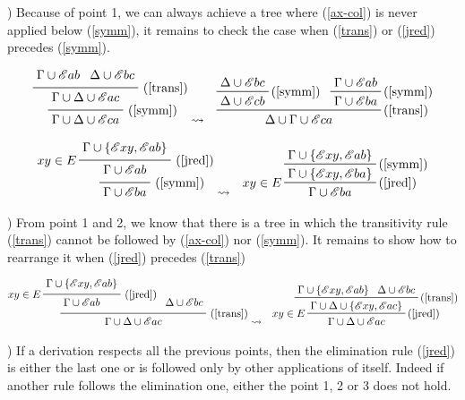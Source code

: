 \documentclass[a4paper,12pt,oneside]{book}
\newcommand{\E}{\mathscr{E}}
\begin{document}
) Because of point 1, we can always achieve a tree where (\ref{ax-col}) is never applied below (\ref{symm}), it remains to check the case when  (\ref{trans}) or (\ref{jred}) precedes (\ref{symm}).

\begin{eqnarray*}
\prfrulenameskip=0.4em\prflinepadbefore=1ex
\prftree[r]{(\ref{symm})} {\prftree[r]{(\ref{trans})}{\Gamma\cup \E ab  }{\Delta\cup \E bc}
{\Gamma\cup\Delta\cup \E ac } 
 }{\Gamma\cup\Delta\cup\E ca } 
& \leadsto
&\prftree[r]{(\ref{trans})} 
 { \prftree[r]{(\ref{symm})}{\Delta\cup\E bc } { \Delta\cup\E cb  } }
 {\prftree[r]{(\ref{symm})}{\Gamma\cup\E ab} { \Gamma\cup\E ba  } }
{\Delta\cup\Gamma\cup\E ca}
 \end{eqnarray*}


\begin{eqnarray*}
\prfrulenameskip=0.4em\prflinepadbefore=1ex
\prftree[r]{(\ref{symm})} 
{\prftree[l,r]{(\ref{jred})}{$xy \in E$}{\Gamma \cup \{\E xy ,\E ab \}}{\Gamma \cup \E ab }}
{\Gamma  \cup \E ba }
& \leadsto
&\prftree[l,r]{(\ref{jred})}{$xy \in E$} 
{\prftree[r]{(\ref{symm})}
{\Gamma \cup \{\E xy ,\E ab \}}
{\Gamma\cup \{\E xy , \E ba \} }}
{\Gamma \cup \E ba }
 \end{eqnarray*}



) From point 1 and 2, we know that there is a tree in which the transitivity rule (\ref{trans}) cannot be followed by (\ref{ax-col}) nor (\ref{symm}). It remains to show how to rearrange it when (\ref{jred}) precedes (\ref{trans})

\begin{eqnarray*}
\prfrulenameskip=0.4em\prflinepadbefore=1ex
\prftree[r]{(\ref{trans})} 
{\prftree[l,r]{(\ref{jred})}{$xy \in E$}{\Gamma \cup \{\E xy ,\E ab \}}{\Gamma \cup \E ab }}
{ \prfassumption{\Delta \cup \E bc  }}
{\Gamma \cup \Delta \cup \E ac }
& \leadsto
&\prftree[l,r]{(\ref{jred})}{$xy \in E$} 
{\prftree[r]{(\ref{trans})}
{\Gamma \cup \{\E xy ,\E ab \}}{\Delta \cup \E bc }
{\Gamma\cup\Delta \cup \{\E xy , \E ac \} }}
{\Gamma \cup \Delta \cup \E ac }
 \end{eqnarray*}

) If a derivation respects all the previous points, then the elimination rule (\ref{jred}) is either the last one or is followed only by other applications of itself. Indeed if another rule follows the elimination one, either the point 1, 2 or 3 does not hold.
\end{document}
